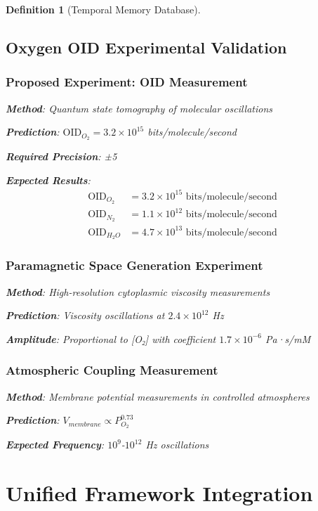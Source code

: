\documentclass[12pt]{article}
\newtheorem{definition}[theorem]{Definition}
\begin{document}
\begin{definition}[Temporal Memory Database]
\subsection{Oxygen OID Experimental Validation}

\subsubsection{Proposed Experiment: OID Measurement}

\textbf{Method}: Quantum state tomography of molecular oscillations

\textbf{Prediction}: $\text{OID}_{O_2} = 3.2 \times 10^{15}$ bits/molecule/second

\textbf{Required Precision}: ±5%

\textbf{Expected Results}:
\begin{align}
\text{OID}_{O_2} &= 3.2 \times 10^{15} \text{ bits/molecule/second} \\
\text{OID}_{N_2} &= 1.1 \times 10^{12} \text{ bits/molecule/second} \\
\text{OID}_{H_2O} &= 4.7 \times 10^{13} \text{ bits/molecule/second}
\end{align}

\subsubsection{Paramagnetic Space Generation Experiment}

\textbf{Method}: High-resolution cytoplasmic viscosity measurements

\textbf{Prediction}: Viscosity oscillations at $2.4 \times 10^{12}$ Hz

\textbf{Amplitude}: Proportional to [O₂] with coefficient $1.7 \times 10^{-6}$ Pa·s/mM

\subsubsection{Atmospheric Coupling Measurement}

\textbf{Method}: Membrane potential measurements in controlled atmospheres

\textbf{Prediction}: $V_{membrane} \propto P_{O_2}^{0.73}$

\textbf{Expected Frequency}: $10^9$-$10^{12}$ Hz oscillations

\section{Unified Framework Integration}


\end{definition}
\end{document}
